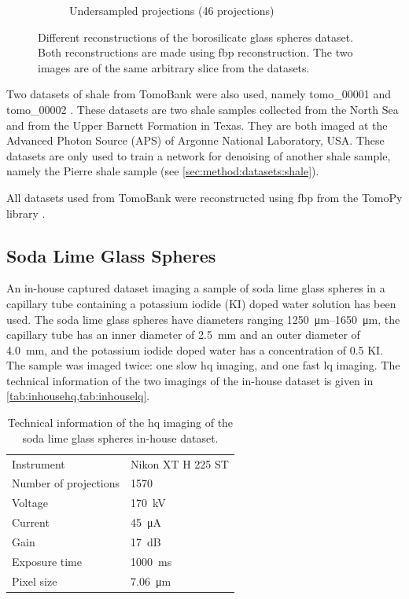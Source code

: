 \begin{figure}
\begin{subfigure}[t]{.45\textwidth}
      \caption{Undersampled projections (46 projections)}
    \end{subfigure}
    \caption[Borosilicate glass spheres dataset]{Different reconstructions of the borosilicate glass spheres dataset. Both reconstructions are made using \gls{fbp} reconstruction. The two images are of the same arbitrary slice from the datasets. }
    \label{fig:tomo00058datasetexample}
\end{figure}

Two datasets of shale from TomoBank were also used, namely tomo\_00001 and tomo\_00002 \cite{datasetshale}. These datasets are two shale samples collected from the North Sea and from the Upper Barnett Formation in Texas. They are both imaged at the Advanced Photon Source (APS) of Argonne National Laboratory, USA. These datasets are only used to train a network for denoising of another shale sample, namely the Pierre shale sample (see \cref{sec:method:datasets:shale}). 

All datasets used from TomoBank were reconstructed using \gls{fbp} from the TomoPy library \cite{tomopy}. 

\subsection{Soda Lime Glass Spheres}
\label{sec:method:datasets:inhouse}
An in-house captured dataset imaging a sample of soda lime glass spheres in a capillary tube containing a potassium iodide (KI) doped water solution has been used. The soda lime glass spheres have diameters ranging \SIrange{1250}{1650}{\micro \meter}, the capillary tube has an inner diameter of \SI{2.5}{\milli \meter} and an outer diameter of \SI{4.0}{\milli \meter}, and the potassium iodide doped water has a concentration of \SI{0.5}{\molar} KI. The sample was imaged twice: one slow \acrlong{hq} imaging, and one fast \acrlong{lq} imaging. The technical information of the two imagings of the in-house dataset is given in \cref{tab:inhousehq,tab:inhouselq}.

\begin{table}[htbp]
    \centering
    \caption[Technical information of the IHHQ soda lime glass spheres dataset]{Technical information of the \acrlong{hq} imaging of the soda lime glass spheres in-house dataset. }
    \label{tab:inhousehq}
    \begin{tabular}{ll}
    \hline
    Instrument & Nikon XT H 225 ST \\
    Number of projections & 1570 \\
    Voltage & \SI{170}{\kilo \volt}\\
    Current & \SI{45}{\micro \ampere}\\
    Gain & \SI{17}{\deci \bel}\\
    Exposure time & \SI{1000}{\milli \second}\\
    Pixel size & \SI{7.06}{\micro \meter} \\
    \hline
    \end{tabular}
\end{table}

